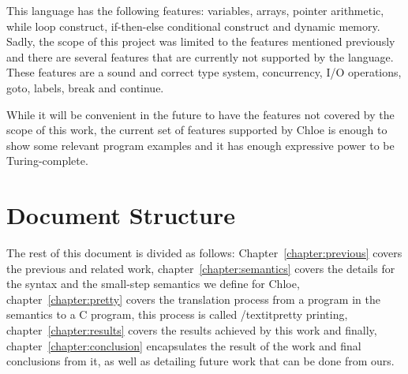 This language has the following features: variables, arrays, pointer arithmetic, while loop construct, if-then-else conditional construct and dynamic memory.
Sadly, the scope of this project was limited to the features mentioned previously and there are several features that are currently not supported by the language.
These features are a sound and correct type system, concurrency, I/O operations, goto, labels, break and continue.

While it will be convenient in the future to have the features not covered by the scope of this work, the current set of features supported by Chloe is enough to show some relevant program examples and it has enough expressive power to be Turing-complete.


\section{Document Structure}\label{section:document_structure}

The rest of this document is divided as follows: Chapter~\ref{chapter:previous} covers the previous and related work, chapter~\ref{chapter:semantics} covers the details for the syntax and the small-step semantics we define for Chloe, chapter~\ref{chapter:pretty} covers the translation process from a program in the semantics to a C program, this process is called /textit{pretty printing}, chapter~\ref{chapter:results} covers the results achieved by this work and finally, chapter~\ref{chapter:conclusion} encapsulates the result of the work and final conclusions from it, as well as detailing future work that can be done from ours.